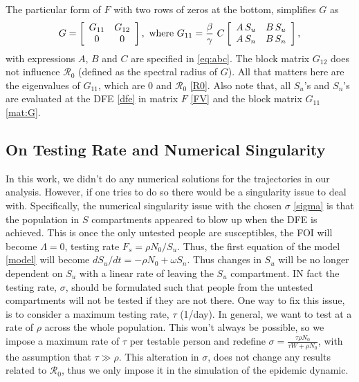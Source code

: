 \documentclass[12pt]{article}
\newcommand{\Rnum}{\mathcal{R}_0}
\theoremstyle{definition} %
\begin{document}
The particular form of $F$ with two rows of zeros at the bottom, simplifies $G$ as 
\begin{equation}
\label{mat:G}
G = \left[ \begin {array}{cc}
G_{11}&G_{12}\\
0&0
\end {array} \right], \text{ where } \\
G_{11} = \frac{\beta}{\gamma}\ C
\left[\begin {array}{cc}
A\,S_u & B\,S_u\\
A\,S_n & B\,S_n
\end {array}\right],
\end{equation}
with expressions $A$, $B$ and $C$ are specified in \eqref{eq:abc}.
The block matrix $G_{12}$ does not influence $\Rnum$ (defined as the spectral radius of $G$). All that matters here are the eigenvalues of $G_{11}$, which are 0 and $\Rnum$ \eqref{R0}.
Also note that, all $S_u$'s and $S_n$'s are evaluated at the DFE \eqref{dfe} in matrix $F$ \eqref{FV} and the block matrix $G_{11}$ \eqref{mat:G}.

\subsection{On Testing Rate and Numerical Singularity}

In this work, we didn't do any numerical solutions for the trajectories in our analysis. However, if one tries to do so there would be a singularity issue to deal with. 
Specifically, the numerical singularity issue with the chosen $\sigma$ \eqref{sigma} is that the population in $S$ compartments appeared to blow up when the DFE is achieved. This is once the only untested people are susceptibles, the FOI will become $\Lambda=0$, testing rate $F_s=\rho N_0/S_u$. Thus, the first equation of the model \eqref{model} will become
$d S_u/dt = - \rho N_0 + \omega S_n$. Thus changes in $S_u$ will be no longer dependent on $S_u$ with a linear rate of leaving the $S_u$ compartment.
IN fact the testing rate, $\sigma$, should be formulated such that people from the untested compartments will not be tested if they are not there.
One way to fix this issue, is to consider a maximum testing rate, $\tau$ (1/day). In general, we want to test at a rate of $\rho$ across the whole population. This won't always be possible, so we impose a maximum rate of $\tau$ per testable person and redefine $\sigma = \frac{\tau \rho N_0}{\tau W + \rho N_0}$, with the assumption that $\tau \gg \rho$. This alteration in $\sigma$, does not change any results related to $\Rnum$, thus we only impose it in the simulation of the epidemic dynamic.
\end{document}
